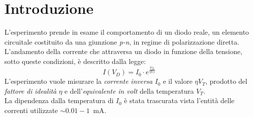 \documentclass[@SRC@/main]{subfiles}
\begin{document}
    \section{Introduzione} \label{sec:introduzione}
    L'esperimento prende in esame il comportamento di un diodo reale, un elemento circuitale
    costituito da una giunzione \textit{p-n}, in regime di polarizzazione diretta.
    L'andamento della corrente che attraversa un diodo in funzione della tensione,
    sotto queste condizioni, è descritto dalla legge:
    \begin{equation}
        \label{eq:caratteristiche}
        I(V_D) = I_0 \cdot e^{\frac{V_D}{\eta V_T}}
    \end{equation}
    L'esperimento vuole misurare la \textit{corrente inversa} $I_0$ e il valore
    $\eta V_T$, prodotto del \textit{fattore di idealità} $\eta$ e
    dell'\textit{equivalente in volt} della temperatura $V_T$. \\
    La dipendenza dalla temperatura di $I_0$ è stata trascurata vista l'entità
    delle correnti utilizzate $\sim 0.01-1$~mA.
\end{document}
